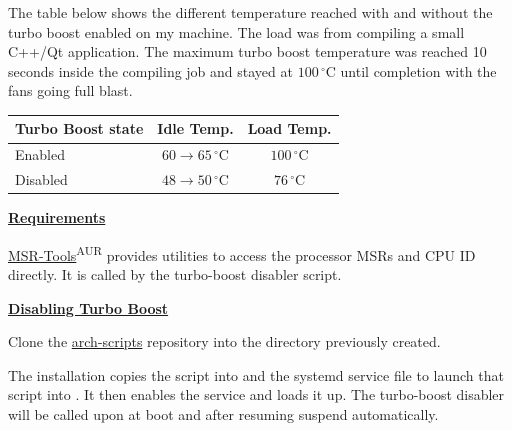 The table below shows the different temperature reached with and without the turbo boost enabled on my machine. The load was from compiling a small C++/Qt application.
The maximum turbo boost temperature was reached 10 seconds inside the compiling job and stayed at $100\,^{\circ}\mathrm{C}$ until completion with the fans going full blast.

\begin{center}
	\vspace*{1em}
	\setlength\arrayrulewidth{1pt}
	\begin{tabular}{|l|c|c|}
		\rowcolor{white!50}
		\hline
		\textbf{Turbo Boost state} & \textbf{Idle Temp.} & \textbf{Load Temp.}\\
		\hline\hline
		Enabled & $60\to 65\,^{\circ}\mathrm{C}$ & $100\,^{\circ}\mathrm{C}$\\ 
		Disabled &  $48\to 50\,^{\circ}\mathrm{C}$ & $76\,^{\circ}\mathrm{C}$\\
		\hline
	\end{tabular}
	\vspace*{1em}
\end{center}

\textbf{\textcolor{textgrey}{\uline{Requirements}}}

\href{https://01.org/msr-tools}{MSR-Tools}\textsuperscript{AUR} provides utilities to access the processor MSRs and CPU ID directly. It is called by the turbo-boost disabler script.


\vspace*{1em}
\textbf{\textcolor{textgrey}{\uline{Disabling Turbo Boost}}}

Clone the \href{https://github.com/An7ar35/arch-scripts}{arch-scripts} repository into the  directory previously created.

\begin{blocksection}
	The installation copies the  script into  and the systemd service file to launch that script into .\newline
	It then enables the service and loads it up. The turbo-boost disabler will be called upon at boot and after resuming suspend automatically.
\end{blocksection}

